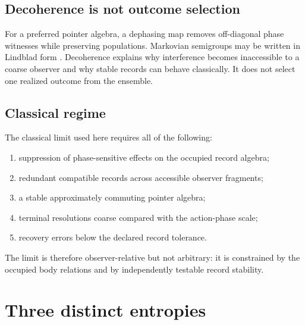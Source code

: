 \documentclass[11pt]{article}
\begin{document}
\subsection{Decoherence is not outcome selection}
For a preferred pointer algebra, a dephasing map removes off-diagonal phase
witnesses while preserving populations.  Markovian semigroups may be written
in Lindblad form \citep{Lindblad1976}.  Decoherence explains why interference
becomes inaccessible to a coarse observer and why stable records can behave
classically.  It does not select one realized outcome from the ensemble.

\subsection{Classical regime}
The classical limit used here requires all of the following:
\begin{enumerate}[label=(C\arabic*)]
\item suppression of phase-sensitive effects on the occupied record algebra;
\item redundant compatible records across accessible observer fragments;
\item a stable approximately commuting pointer algebra;
\item terminal resolutions coarse compared with the action-phase scale;
\item recovery errors below the declared record tolerance.
\end{enumerate}
The limit is therefore observer-relative but not arbitrary: it is constrained
by the occupied body relations and by independently testable record stability.

\section{Three distinct entropies}
\end{document}
